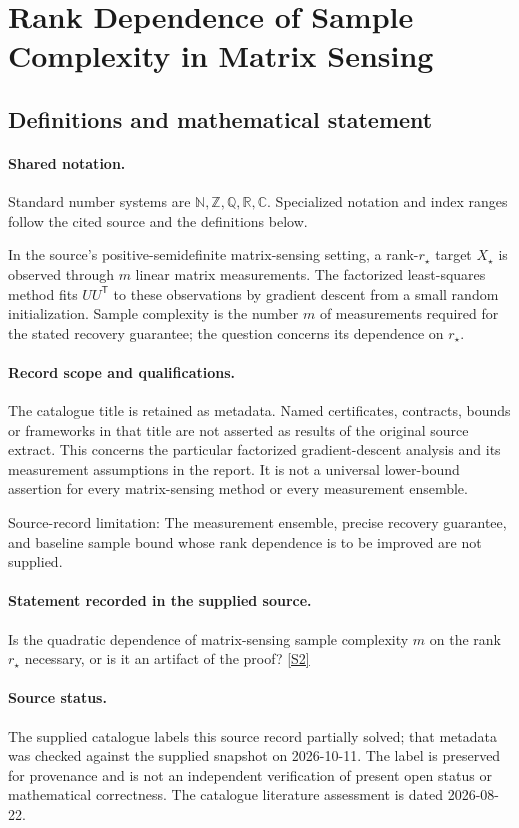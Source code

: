 \documentclass[11pt]{article}
\newcommand{\sref}[2]{\hyperlink{source:#1:#2}{[S#2]}}
\begin{document}
\section{Rank Dependence of Sample Complexity in Matrix Sensing}\label{statement}

\subsection{Definitions and mathematical statement}

\paragraph{Shared notation.}Standard number systems are $\mathbb N,\mathbb Z,\mathbb Q,\mathbb R,\mathbb C$. Specialized notation and index ranges follow the cited source and the definitions below.


In the source's positive-semidefinite matrix-sensing setting, a rank-$r_\star$ target $X_\star$ is observed through $m$ linear matrix measurements. The factorized least-squares method fits $UU^{\mathsf T}$ to these observations by gradient descent from a small random initialization. Sample complexity is the number $m$ of measurements required for the stated recovery guarantee; the question concerns its dependence on $r_\star$.
\paragraph{Record scope and qualifications.}
The catalogue title is retained as metadata. Named certificates, contracts, bounds or frameworks in that title are not asserted as results of the original source extract.
This concerns the particular factorized gradient-descent analysis and its measurement assumptions in the report. It is not a universal lower-bound assertion for every matrix-sensing method or every measurement ensemble.

Source-record limitation: The measurement ensemble, precise recovery guarantee, and baseline sample bound whose rank dependence is to be improved are not supplied.
\paragraph{Statement recorded in the supplied source.}
Is the quadratic dependence of matrix-sensing sample complexity $m$ on the rank $r_\star$ necessary, or is it an artifact of the proof? \sref{statement}{2}
\paragraph{Source status.}
The supplied catalogue labels this source record partially solved; that metadata was checked against the supplied snapshot on 2026-10-11. The label is preserved for provenance and is not an independent verification of present open status or mathematical correctness. The catalogue literature assessment is dated 2026-08-22.
\end{document}
